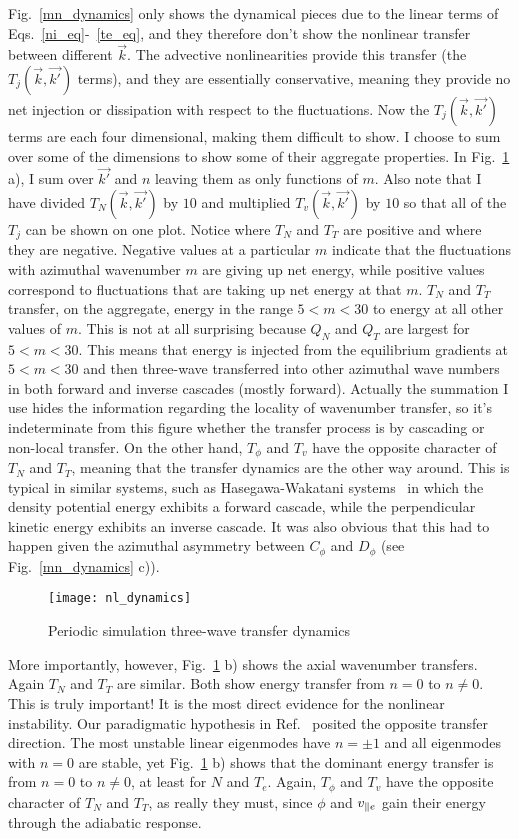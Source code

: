 Fig.~\ref{mn_dynamics} only shows the dynamical pieces due to the linear terms of Eqs.~\ref{ni_eq}-~\ref{te_eq}, and they therefore don't show the nonlinear transfer between different $\vec{k}$.
The advective nonlinearities provide this transfer (the $T_j(\vec{k},\vec{k'})$ terms), 
and they are essentially conservative, meaning they provide no net injection or dissipation with respect to the fluctuations. Now the $T_j(\vec{k},\vec{k'})$ terms are each four dimensional,
making them difficult to show. I choose to sum over some of the dimensions to show some of their aggregate properties. In Fig.~\ref{nl_dynamics} a), I sum over $\vec{k'}$ and $n$ leaving them
as only functions of $m$. Also note that I have divided $T_N(\vec{k},\vec{k'})$ by $10$ and multiplied $T_v(\vec{k},\vec{k'})$ by $10$ so that all of the $T_j$ can be shown on one plot.
Notice where $T_N$ and $T_T$ are positive and where they are negative. Negative values at a particular $m$ indicate that the fluctuations with azimuthal wavenumber $m$ are giving up net energy, 
while positive values correspond to fluctuations that are taking up net energy at that $m$. 
$T_N$ and $T_T$ transfer, on the aggregate, energy in the range $5 < m < 30$ to energy at all other values of $m$. This is not at all surprising because $Q_N$ and $Q_T$ are largest
for $5 < m < 30$. This means that energy is injected from the equilibrium gradients at $5 < m < 30$ and then three-wave transferred into other azimuthal wave numbers in both forward and inverse
cascades (mostly forward). 
Actually the summation I use hides the information regarding the locality of wavenumber transfer, so it's indeterminate from this figure whether the transfer process is by cascading or non-local transfer.
On the other hand, $T_\phi$ and $T_v$ have the opposite character of $T_N$ and $T_T$, meaning that the transfer dynamics are the other way around. This is typical in 
similar systems, such as Hasegawa-Wakatani systems~\cite{hasegawa1983,Camargo1995} in which the density potential energy exhibits a forward cascade, while the perpendicular kinetic energy
exhibits an inverse cascade. It was also obvious that this had to happen given the azimuthal asymmetry between $C_\phi$ and $D_\phi$ (see Fig.~\ref{mn_dynamics} c)).

\begin{figure}
\centerline{\texttt{[image: nl\_dynamics]}}
\caption{Periodic simulation three-wave transfer dynamics}
\label{nl_dynamics}
\end{figure}

More importantly, however, Fig.~\ref{nl_dynamics} b) shows the axial wavenumber transfers. Again $T_N$ and $T_T$ are similar. Both show energy transfer from $n=0$ to $n \ne 0$. This is truly important!
It is the most direct evidence for the nonlinear instability.
Our paradigmatic hypothesis in Ref.~\cite{Umansky2011} posited the opposite transfer direction. The most unstable linear eigenmodes have $n = \pm 1$ and all eigenmodes with $n=0$ are stable,
yet Fig.~\ref{nl_dynamics} b) shows that the dominant energy transfer is from $n=0$ to $n \ne 0$, at least for $N$ and $T_e$. Again, $T_\phi$ and $T_v$ have the opposite character of $T_N$ and $T_T$,
as really they must, since $\phi$ and $v_{\parallel e}$ gain their energy through the adiabatic response.

